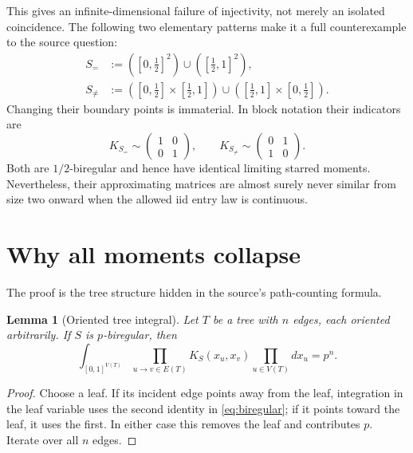 \documentclass[11pt]{article}
\newtheorem{lemma}{Lemma}
\newcommand{\1}{\mathbf 1}
\begin{document}
This gives an infinite-dimensional failure of injectivity, not merely an
isolated coincidence.  The following two elementary patterns make it a full
counterexample to the source question:
\begin{align}
 S_= &:=([0,\tfrac12]^2)\cup([\tfrac12,1]^2),\label{eq:equal}\\
 S_{\ne}&:=([0,\tfrac12]\times[\tfrac12,1])
 \cup([\tfrac12,1]\times[0,\tfrac12]).\label{eq:unequal}
\end{align}
Changing their boundary points is immaterial.  In block notation their
indicators are
\[
 K_{S_=}\sim\begin{pmatrix}1&0\\0&1\end{pmatrix},
 \qquad
 K_{S_{\ne}}\sim\begin{pmatrix}0&1\\1&0\end{pmatrix}.
\]
Both are $1/2$-biregular and hence have identical limiting starred moments.
Nevertheless, their approximating matrices are almost surely never similar
from size two onward when the allowed iid entry law is continuous.

\section*{Why all moments collapse}

The proof is the tree structure hidden in the source's path-counting formula.

\begin{lemma}[Oriented tree integral]\label{lem:tree}
Let $T$ be a tree with $n$ edges, each oriented arbitrarily.  If $S$ is
$p$-biregular, then
\[
 \int_{[0,1]^{V(T)}}
 \prod_{u\to v\in E(T)}K_S(x_u,x_v)\prod_{u\in V(T)}dx_u=p^n.
\]
\end{lemma}

\begin{proof}
Choose a leaf.  If its incident edge points away from the leaf, integration
in the leaf variable uses the second identity in \eqref{eq:biregular}; if it
points toward the leaf, it uses the first.  In either case this removes the
leaf and contributes $p$.  Iterate over all $n$ edges.
\end{proof}
\end{document}
